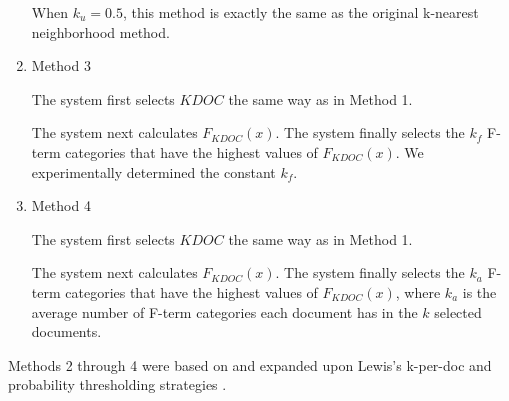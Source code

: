 \documentclass[english]{jnlp_1.2c}
\begin{document}
\begin{enumerate}
When $k_u=0.5$, this method is exactly 
the same as the original k-nearest neighborhood method.

\item 
Method 3

The system first selects $KDOC$ the same way as in Method 1.

The system next calculates $F_{KDOC}(x)$. 
The system finally selects 
the $k_f$ F-term categories that 
have the highest values of $F_{KDOC}(x)$. 
We experimentally determined the constant $k_f$.

\item 
Method 4

The system first selects $KDOC$ the same way as in Method 1.

The system next calculates $F_{KDOC}(x)$. 
The system finally selects 
the $k_a$ F-term categories that 
have the highest values of $F_{KDOC}(x)$, where 
$k_a$ is the average number of F-term categories 
each document has in the $k$ selected documents. 

\end{enumerate}

Methods 2 through 4 
were based on and expanded upon Lewis's k-per-doc and probability thresholding strategies \cite{Lewis92_2}.
\end{document}
